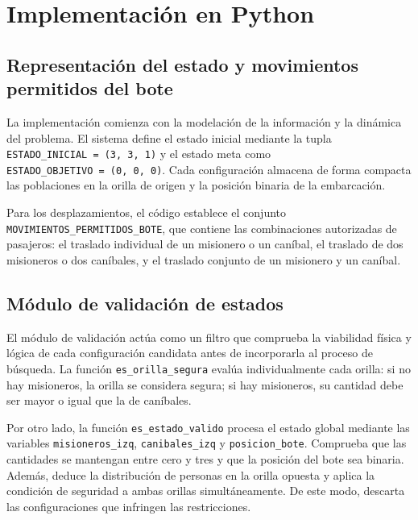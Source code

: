 \documentclass[
  spanish,
  11pt,
]{article}
\begin{document}
\section{Implementación en Python}\label{implementaciuxf3n-en-python}

\subsection{Representación del estado y movimientos permitidos del
bote}\label{representaciuxf3n-del-estado-y-movimientos-permitidos-del-bote}

La implementación comienza con la modelación de la información y la
dinámica del problema. El sistema define el estado inicial mediante la
tupla \texttt{ESTADO\_INICIAL\ =\ (3,\ 3,\ 1)} y el estado meta como
\texttt{ESTADO\_OBJETIVO\ =\ (0,\ 0,\ 0)}. Cada configuración almacena
de forma compacta las poblaciones en la orilla de origen y la posición
binaria de la embarcación.

Para los desplazamientos, el código establece el conjunto
\texttt{MOVIMIENTOS\_PERMITIDOS\_BOTE}, que contiene las combinaciones
autorizadas de pasajeros: el traslado individual de un misionero o un
caníbal, el traslado de dos misioneros o dos caníbales, y el traslado
conjunto de un misionero y un caníbal.

\subsection{Módulo de validación de
estados}\label{muxf3dulo-de-validaciuxf3n-de-estados}

El módulo de validación actúa como un filtro que comprueba la viabilidad
física y lógica de cada configuración candidata antes de incorporarla al
proceso de búsqueda. La función \texttt{es\_orilla\_segura} evalúa
individualmente cada orilla: si no hay misioneros, la orilla se
considera segura; si hay misioneros, su cantidad debe ser mayor o igual
que la de caníbales.

Por otro lado, la función \texttt{es\_estado\_valido} procesa el estado
global mediante las variables \texttt{misioneros\_izq},
\texttt{canibales\_izq} y \texttt{posicion\_bote}. Comprueba que las
cantidades se mantengan entre cero y tres y que la posición del bote sea
binaria. Además, deduce la distribución de personas en la orilla opuesta
y aplica la condición de seguridad a ambas orillas simultáneamente. De
este modo, descarta las configuraciones que infringen las restricciones.
\end{document}
